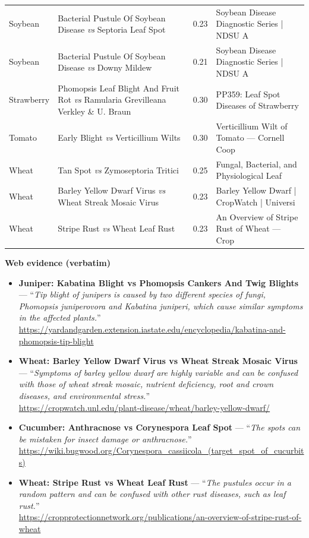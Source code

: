 \documentclass[11pt]{article}
\begin{document}
{\begin{longtable}{p{2.4cm}p{6.6cm}cp{4.0cm}}
Soybean & Bacterial Pustule Of Soybean Disease \emph{vs} Septoria Leaf Spot & 0.23 & Soybean Disease Diagnostic Series | NDSU A \\
Soybean & Bacterial Pustule Of Soybean Disease \emph{vs} Downy Mildew & 0.21 & Soybean Disease Diagnostic Series | NDSU A \\
Strawberry & Phomopsis Leaf Blight And Fruit Rot \emph{vs} Ramularia Grevilleana Verkley \& U. Braun & 0.30 & PP359: Leaf Spot Diseases of Strawberry \\
Tomato & Early Blight \emph{vs} Verticillium Wilts & 0.30 & Verticillium Wilt of Tomato --- Cornell Coop \\
Wheat & Tan Spot \emph{vs} Zymoseptoria Tritici & 0.25 & Fungal, Bacterial, and Physiological Leaf  \\
Wheat & Barley Yellow Dwarf Virus \emph{vs} Wheat Streak Mosaic Virus & 0.23 & Barley Yellow Dwarf | CropWatch | Universi \\
Wheat & Stripe Rust \emph{vs} Wheat Leaf Rust & 0.23 & An Overview of Stripe Rust of Wheat --- Crop \\
\end{longtable}}
\vspace{2pt}\textbf{\large Web evidence (verbatim)}
\begin{itemize}[leftmargin=1.2em,itemsep=3pt]
\item \textbf{Juniper: Kabatina Blight vs Phomopsis Cankers And Twig Blights} --- ``\emph{Tip blight of junipers is caused by two different species of fungi, Phomopsis juniperovora and Kabatina juniperi, which cause similar symptoms in the affected plants.}'' \\ \footnotesize\url{https://yardandgarden.extension.iastate.edu/encyclopedia/kabatina-and-phomopsis-tip-blight}
\item \textbf{Wheat: Barley Yellow Dwarf Virus vs Wheat Streak Mosaic Virus} --- ``\emph{Symptoms of barley yellow dwarf are highly variable and can be confused with those of wheat streak mosaic, nutrient deficiency, root and crown diseases, and environmental stress.}'' \\ \footnotesize\url{https://cropwatch.unl.edu/plant-disease/wheat/barley-yellow-dwarf/}
\item \textbf{Cucumber: Anthracnose vs Corynespora Leaf Spot} --- ``\emph{The spots can be mistaken for insect damage or anthracnose.}'' \\ \footnotesize\url{https://wiki.bugwood.org/Corynespora_cassiicola_(target_spot_of_cucurbits)}
\item \textbf{Wheat: Stripe Rust vs Wheat Leaf Rust} --- ``\emph{The pustules occur in a random pattern and can be confused with other rust diseases, such as leaf rust.}'' \\ \footnotesize\url{https://cropprotectionnetwork.org/publications/an-overview-of-stripe-rust-of-wheat}
\end{itemize}
\end{document}
